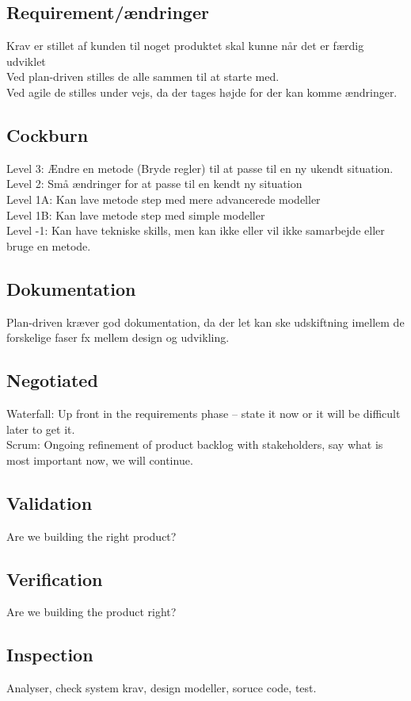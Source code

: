 \documentclass[11pt,a4paper]{article}
\begin{document}
\subsection{Requirement/ændringer}
Krav er stillet af kunden til noget produktet skal kunne når det er færdig udviklet\\
Ved plan-driven stilles de alle sammen til at starte med.\\
Ved agile de stilles under vejs, da der tages højde for der kan komme ændringer.
\subsection{Cockburn}
Level 3: Ændre en metode (Bryde regler) til at passe til en ny ukendt situation.\\
Level 2: Små ændringer for at passe til en kendt ny situation\\
Level 1A: Kan lave metode step med mere advancerede modeller\\
Level 1B: Kan lave metode step med simple modeller\\
Level -1: Kan have tekniske skills, men kan ikke eller vil ikke samarbejde eller bruge en metode.
\subsection{Dokumentation}
Plan-driven kræver god dokumentation, da der let kan ske udskiftning imellem de forskelige faser fx mellem design og udvikling.
\subsection{Negotiated}
Waterfall: Up front in the requirements phase – state it now or it will be difficult later to get it.\\
Scrum: Ongoing refinement of product backlog with stakeholders, say what is most important now, we will continue.
\subsection{Validation}
Are we building the right product?
\subsection{Verification}
Are we building the product right?
\subsection{Inspection}
Analyser, check system krav, design modeller, soruce code, test.
\end{document}
